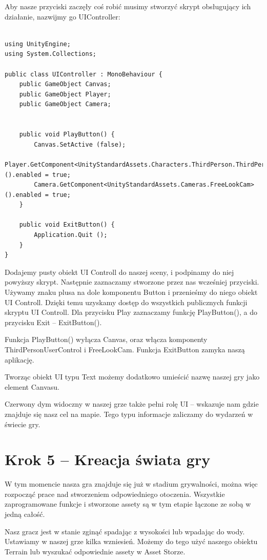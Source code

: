 \documentclass[brudnopis]{xmgr}
\begin{document}
Aby nasze przyciski zaczęły coś robić musimy stworzyć skrypt obsługujący ich działanie, nazwijmy go UIController:

\begin{lstlisting}

using UnityEngine;
using System.Collections;

public class UIController : MonoBehaviour {
    public GameObject Canvas;
    public GameObject Player;
    public GameObject Camera;


    public void PlayButton() {
        Canvas.SetActive (false);
        Player.GetComponent<UnityStandardAssets.Characters.ThirdPerson.ThirdPersonUserControl> ().enabled = true;
        Camera.GetComponent<UnityStandardAssets.Cameras.FreeLookCam> ().enabled = true;
    }

    public void ExitButton() {
        Application.Quit ();
    }
} 

\end{lstlisting}

Dodajemy pusty obiekt UI Controll do naszej sceny, i podpinamy do niej powyższy skrypt. Następnie zaznaczamy stworzone przez nas wcześniej przyciski. Używamy znaku plusa na dole komponentu Button i przenieśmy do niego obiekt UI Controll. Dzięki temu uzyskamy dostęp do wszystkich publicznych funkcji skryptu UI Controll. Dla przycisku Play zaznaczamy funkcję PlayButton(), a do przycisku Exit – ExitButton(). 

Funkcja PlayButton() wyłącza Canvas, oraz włącza komponenty ThirdPersonUserControl i FreeLookCam. Funkcja ExitButton zamyka naszą aplikację.

Tworząc obiekt UI typu Text możemy dodatkowo umieścić nazwę naszej gry jako element Canvasu.

Czerwony dym widoczny w naszej grze także pełni rolę UI – wskazuje nam gdzie znajduje się nasz cel na mapie. Tego typu informacje zaliczamy do wydarzeń w świecie gry.

\section{Krok 5 – Kreacja świata gry}

W tym momencie nasza gra znajduje się już w stadium grywalności, można więc rozpocząć prace nad stworzeniem odpowiedniego otoczenia. Wszystkie zaprogramowane funkcje i stworzone assety są w tym etapie łączone ze sobą w jedną całość. 

Nasz gracz jest  w stanie zginąć spadając z wysokości lub wpadając do wody. Ustawiamy w naszej grze kilka wzniesień. Możemy do tego użyć naszego obiektu Terrain lub wyszukać odpowiednie assety w Asset Storze. 
\end{document}
